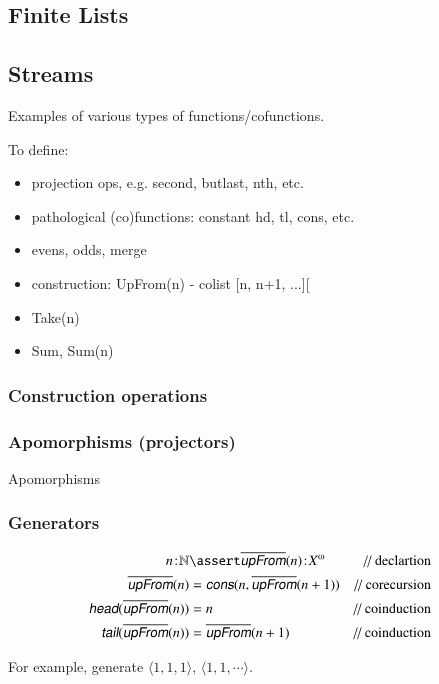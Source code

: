 \documentclass{article}
\begin{document}
\subsection{Finite Lists}

\subsection{Streams}

Examples of various types of functions/cofunctions.

To define:

\begin{itemize}
\item projection ops, e.g. second, butlast, nth, etc.
\item pathological (co)functions: constant hd, tl, cons, etc.
\item evens, odds, merge
\item construction: UpFrom(n) - colist [n, n+1, ...][
\item Take(n)
\item Sum, Sum(n)
\end{itemize}


\subsubsection{Construction operations}

\subsubsection{Apomorphisms (projectors)}

Apomorphisms

\subsubsection{Generators}

\begin{align}
  \tj{n}{\Nat} & \linfer \tj{\codefn{upFrom}(n)}{\colist{X}} & \text{// declartion} \\
  \codefn{upFrom}(n) & = \cocons(n, \codefn{upFrom}(n+1)) & \text{// corecursion} \\
  \cohead(\codefn{upFrom}(n)) & = n & \text{// coinduction} \\
  \cotail(\codefn{upFrom}(n)) & = \codefn{upFrom}(n+1) & \text{// coinduction}
\end{align}

For example, generate \(\langle 1,1,1\rangle\), \(\langle 1,1,\cdots\rangle\).
\end{document}
